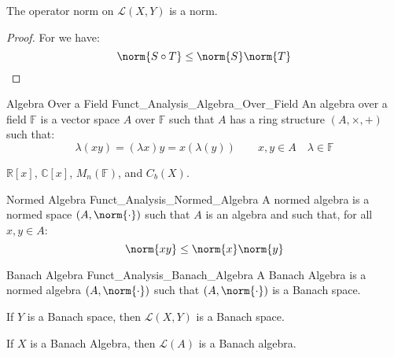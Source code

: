 \documentclass[crop=false,class=book,oneside]{standalone}                      %
\begin{document}
        \begin{theorem}
            The operator norm on $\mathscr{L}(X,Y)$ is a norm.
        \end{theorem}
        \begin{proof}
            For we have:
            \begin{equation}
                \norm{S\circ{T}}\leq\norm{S}\norm{T}
            \end{equation}
        \end{proof}
        \begin{ldefinition}{Algebra Over a Field}
              {Funct_Analysis_Algebra_Over_Field}
            An algebra over a field $\mathbb{F}$ is a vector
            space $A$ over $\mathbb{F}$ such that $A$ has a ring
            structure $(A,\times,+)$ such that:
            \begin{equation}
                \lambda(xy)=(\lambda{x})y
                =x(\lambda(y))
                \quad\quad
                x,y\in{A}
                \quad\lambda\in\mathbb{F}
            \end{equation}
        \end{ldefinition}
        \begin{lexample}
            $\mathbb{R}[x]$, $\mathbb{C}[x]$, $M_{n}(\mathbb{F})$,
            and $C_{b}(X)$.
        \end{lexample}
        \begin{ldefinition}{Normed Algebra}
              {Funct_Analysis_Normed_Algebra}
            A normed algebra is a normed space $(A,\norm{\cdot})$
            such that $A$ is an algebra and such that,
            for all $x,y\in{A}$:
            \begin{equation}
                \norm{xy}\leq\norm{x}\norm{y}
            \end{equation}
        \end{ldefinition}
        \begin{ldefinition}{Banach Algebra}
              {Funct_Analysis_Banach_Algebra}
            A Banach Algebra is a normed algebra $(A,\norm{\cdot})$
            such that $(A,\norm{\cdot})$ is a Banach space.
        \end{ldefinition}
        \begin{theorem}
            If $Y$ is a Banach space, then $\mathscr{L}(X,Y)$
            is a Banach space.
        \end{theorem}
        \begin{theorem}
            If $X$ is a Banach Algebra, then
            $\mathscr{L}(A)$ is a Banach algebra.
        \end{theorem}
\end{document}
